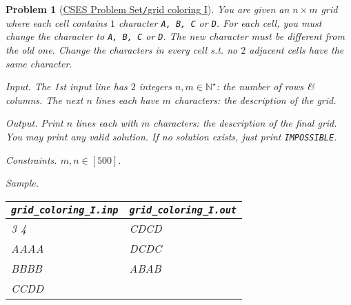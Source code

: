 \documentclass{article}
\newtheorem{problem}{Problem}
\begin{document}
\begin{problem}[\href{https://cses.fi/problemset/task/3311}{CSES Problem Set{\tt/}grid coloring I}]
    You are given an $n\times m$ grid where each cell contains $1$ character {\tt A, B, C} or {\tt D}. For each cell, you must change the character to {\tt A, B, C} or {\tt D}. The new character must be different from the old one. Change the characters in every cell s.t. no $2$ adjacent cells have the same character.
    \item {\sf Input.} The 1st input line has $2$ integers $n,m\in\mathbb{N}^\star$: the number of rows \& columns. The next $n$ lines each have $m$ characters: the description of the grid.
    \item {\sf Output.} Print $n$ lines each with $m$ characters: the description of the final grid. You may print any valid solution. If no solution exists, just print {\tt IMPOSSIBLE}.
    \item {\sf Constraints.} $m,n\in[500]$.
    \item {\sf Sample.}
    \begin{table}[H]
        \centering
        \begin{tabular}{|l|l|}
            \hline
            \verb|grid_coloring_I.inp| & \verb|grid_coloring_I.out| \\
            \hline
            3 4 & CDCD \\
            AAAA & DCDC \\
            BBBB & ABAB \\
            CCDD & \\
            \hline
        \end{tabular}
    \end{table}
\end{problem}
\end{document}
